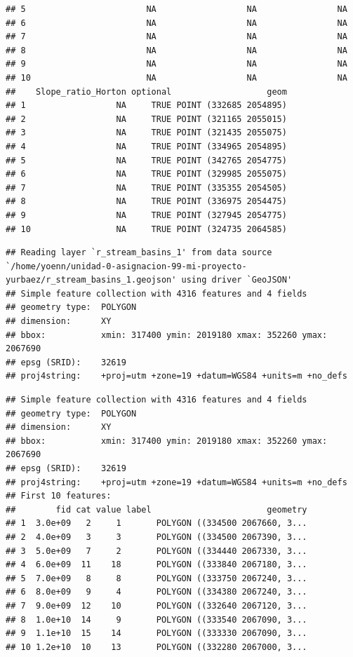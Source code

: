 \documentclass[11pt,]{article}
\begin{document}
\begin{verbatim}
## 5                        NA                  NA                NA
## 6                        NA                  NA                NA
## 7                        NA                  NA                NA
## 8                        NA                  NA                NA
## 9                        NA                  NA                NA
## 10                       NA                  NA                NA
##    Slope_ratio_Horton optional                   geom
## 1                  NA     TRUE POINT (332685 2054895)
## 2                  NA     TRUE POINT (321165 2055015)
## 3                  NA     TRUE POINT (321435 2055075)
## 4                  NA     TRUE POINT (334965 2054895)
## 5                  NA     TRUE POINT (342765 2054775)
## 6                  NA     TRUE POINT (329985 2055075)
## 7                  NA     TRUE POINT (335355 2054505)
## 8                  NA     TRUE POINT (336975 2054475)
## 9                  NA     TRUE POINT (327945 2054775)
## 10                 NA     TRUE POINT (324735 2064585)
\end{verbatim}

\begin{verbatim}
## Reading layer `r_stream_basins_1' from data source `/home/yoenn/unidad-0-asignacion-99-mi-proyecto-yurbaez/r_stream_basins_1.geojson' using driver `GeoJSON'
## Simple feature collection with 4316 features and 4 fields
## geometry type:  POLYGON
## dimension:      XY
## bbox:           xmin: 317400 ymin: 2019180 xmax: 352260 ymax: 2067690
## epsg (SRID):    32619
## proj4string:    +proj=utm +zone=19 +datum=WGS84 +units=m +no_defs
\end{verbatim}

\begin{verbatim}
## Simple feature collection with 4316 features and 4 fields
## geometry type:  POLYGON
## dimension:      XY
## bbox:           xmin: 317400 ymin: 2019180 xmax: 352260 ymax: 2067690
## epsg (SRID):    32619
## proj4string:    +proj=utm +zone=19 +datum=WGS84 +units=m +no_defs
## First 10 features:
##        fid cat value label                       geometry
## 1  3.0e+09   2     1       POLYGON ((334500 2067660, 3...
## 2  4.0e+09   3     3       POLYGON ((334500 2067390, 3...
## 3  5.0e+09   7     2       POLYGON ((334440 2067330, 3...
## 4  6.0e+09  11    18       POLYGON ((333840 2067180, 3...
## 5  7.0e+09   8     8       POLYGON ((333750 2067240, 3...
## 6  8.0e+09   9     4       POLYGON ((334380 2067240, 3...
## 7  9.0e+09  12    10       POLYGON ((332640 2067120, 3...
## 8  1.0e+10  14     9       POLYGON ((333540 2067090, 3...
## 9  1.1e+10  15    14       POLYGON ((333330 2067090, 3...
## 10 1.2e+10  10    13       POLYGON ((332280 2067000, 3...
\end{verbatim}
\end{document}
